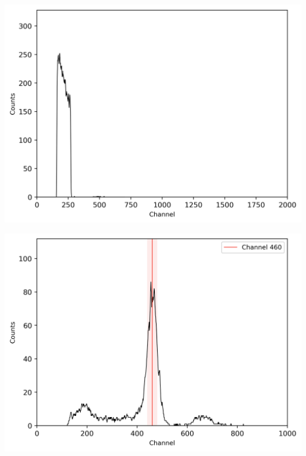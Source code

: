 \begin{multicols}{2}
\begin{center}
\begin{adjustbox}{max width=\linewidth, keepaspectratio}
        \end{adjustbox}
        \label{fig:137CsmitTPHC_gated}
    \end{center}
\endminipage
%
\vspace{10mm}
%
\minipage{\linewidth}
    \begin{center}
        \captionsetup{type=figure}
        \begin{adjustbox}{max width=\linewidth, keepaspectratio}
            \includegraphics[]{png/signal2eneriewindow}
        \end{adjustbox}
        \label{fig:signal2eneriewindow}
    \end{center}
\endminipage
%
\vspace{10mm}
%
\minipage{\linewidth}
    \begin{center}
        \captionsetup{type=figure}
        \begin{adjustbox}{max width=\linewidth, keepaspectratio}
            \includegraphics[]{png/comptonpeak}

\end{adjustbox}
\end{center}
\end{multicols}
